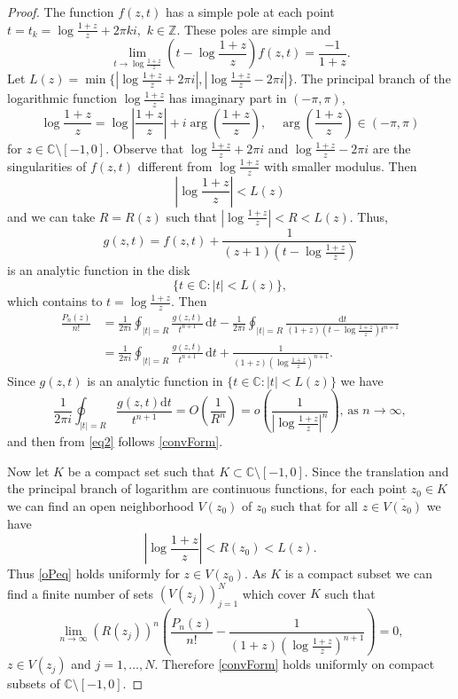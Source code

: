\documentclass[11pt]{article}
\newcommand{\Z}{\mathbb{Z}}
\newcommand{\C}{\mathbb{C}}
\newcommand{\dd}{\mathrm{d}}
\begin{document}
\begin{proof}
The function $f(z,t)$ has a simple pole at each point $t=t_k=\log\frac{1+z}{z}+2\pi k i,$ $k\in\Z$. These poles are simple and
\[
\lim_{t\to \log\frac{1+z}{z}}(t-\log\frac{1+z}{z})f(z,t)=\frac{-1}{1+z}.
\]
Let $L(z)=\min\{|\log\frac{1+z}{z}+2\pi i|, |\log\frac{1+z}{z}-2\pi i|\}$. The principal branch of the logarithmic function $\log\frac{1+z}{z}$ has imaginary part in $(-\pi,\pi)$,
\[
\log\frac{1+z}{z}=\log\left|\frac{1+z}{z}\right|+i \arg\left(\frac{1+z}{z}\right),\quad  
\arg\left(\frac{1+z}{z}\right)\in (-\pi,\pi)
\]
for $z\in \C\setminus [-1,0]$. Observe that $\log\frac{1+z}{z}+2\pi i$ and $\log\frac{1+z}{z}-2\pi i$ are the  singularities  of $f(z,t)$  different from $\log\frac{1+z}{z}$ with smaller modulus. Then
\[
\left|\log\frac{1+z}{z}\right|<L(z)
\]
and we can take $R=R(z)$ such that $|\log\frac{1+z}{z}|<R<L(z)$. 
Thus, 
\[
g(z,t)=f(z,t)+\frac{1}{(z+1)(t-\log\frac{1+z}{z})}
\]
is an analytic function in the disk
\[
\{t\in\C:|t|<L(z)\},
\]
which contains to $t=\log\frac{1+z}{z}$. Then
\begin{align}
\label{eq2}
\frac{P_n(z)}{n!}&=\frac{1}{2\pi i}\oint_{|t|=R}\frac{g(z,t)}{t^{n+1}}\, \dd t-\frac{1}{2\pi i}\oint_{|t|=R}\frac{\dd t}{(1+z)(t-\log\frac{1+z}{z})t^{n+1}} \nonumber\\&=\frac{1}{2\pi i}\oint_{|t|=R}\frac{g(z,t)}{t^{n+1}}\, \dd t+\frac{1}{(1+z)(\log\frac{1+z}{z})^{n+1}}.
\end{align}
Since $g(z,t)$ is an analytic function in $\{t\in\C:|t|<L(z)\}$ we have
\begin{equation}
\label{oPeq}
\frac{1}{2\pi i}\oint_{|t|=R}\frac{g(z,t)\dd t}{t^{n+1}}=O\left(\frac{1}{R^n}\right)=o\left(\frac{1}{|\log\frac{1+z}{z}|^n}\right),\, \text{as }n\to\infty,
\end{equation}
and then from \eqref{eq2} follows \eqref{convForm}.

Now let $K$ be a compact set such that $K\subset \C\setminus [-1,0]$. Since the translation and the principal branch of logarithm are continuous functions, for each point $z_0\in K$ we can find an open neighborhood $V(z_0)$ of $z_0$ such that for all $z\in \overline{V(z_0)}$ we have
\[
\left|\log\frac{1+z}{z}\right|<R(z_0)<L(z).
\]
Thus \eqref{oPeq} holds uniformly for $z\in V(z_0)$. As $K$ is a compact subset we can find a finite number of sets $\left(V(z_j)\right)_{j=1}^{N}$ which cover $K$ such that  
\begin{equation}
\label{eqConvUnif}
\lim_{n\to\infty}(R(z_j))^n\left(\frac{P_n(z)}{n!}-\frac{1}{(1+z)(\log\frac{1+z}{z})^{n+1}}\right)=0,
\end{equation}
$z\in V(z_j)$ and $j=1,\ldots,N$. Therefore \eqref{convForm} holds uniformly on compact subsets of $\C\setminus [-1,0]$. 


\end{proof}
\end{document}
